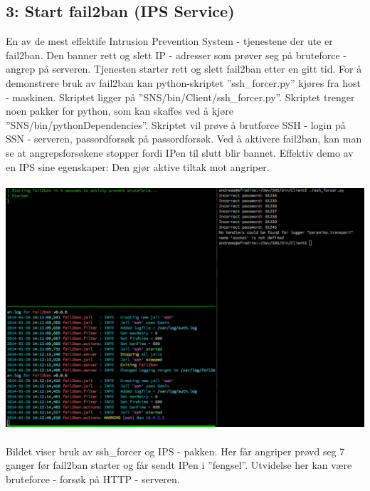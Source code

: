 \documentclass{article}
\begin{document}
\subsection{3: Start fail2ban (IPS Service)}
En av de mest effektife Intrusion Prevention System - tjenestene der ute er fail2ban. Den banner rett og slett IP - adresser som prøver seg på bruteforce - angrep på serveren. Tjenesten starter rett og slett fail2ban etter en gitt tid. For å demonstrere bruk av fail2ban kan python-skriptet ''ssh\_forcer.py'' kjøres fra host - maskinen. Skriptet ligger på ''SNS/bin/Client/ssh\_forcer.py''. Skriptet trenger noen pakker for python, som kan skaffes ved å kjøre ''SNS/bin/pythonDependencies''. Skriptet vil prøve å brutforce SSH - login på SSN - serveren, passordforsøk på passordforsøk. Ved å aktivere fail2ban, kan man se at angrepsforsøkene stopper fordi IPen til slutt blir bannet. Effektiv demo av en IPS sine egenskaper: Den gjør aktive tiltak mot angriper.
\\ \\
\includegraphics[scale = 0.5]{pictures/ips.png}
\\ \\
Bildet viser bruk av ssh\_forcer og IPS - pakken. Her får angriper prøvd seg 7 ganger før fail2ban starter og får sendt IPen i ''fengsel''. Utvidelse her kan være bruteforce - forsøk på HTTP - serveren. 
\end{document}
